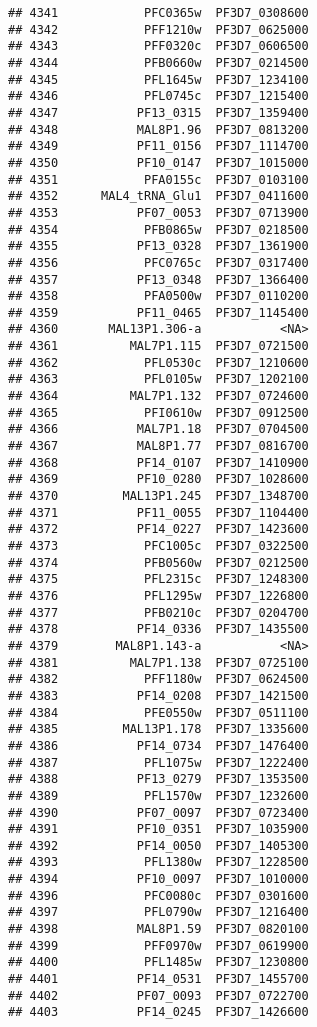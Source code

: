 \documentclass{article}\usepackage[]{graphicx}\usepackage[]{color}
\makeatletter
\newenvironment{kframe}{%
 \def\at@end@of@kframe{}%
 \ifinner\ifhmode%
  \def\at@end@of@kframe{\end{minipage}}%
  \begin{minipage}{\columnwidth}%
 \fi\fi%
 \def\FrameCommand##1{\hskip\@totalleftmargin \hskip-\fboxsep
 \colorbox{shadecolor}{##1}\hskip-\fboxsep
     \hskip-\linewidth \hskip-\@totalleftmargin \hskip\columnwidth}%
 \MakeFramed {\advance\hsize-\width
   \@totalleftmargin\z@ \linewidth\hsize
   \@setminipage}}%
 {\par\unskip\endMakeFramed%
 \at@end@of@kframe}
\newenvironment{knitrout}{}{} %
\makeatother
\begin{document}
\begin{knitrout}
\begin{kframe}
\begin{verbatim}
## 4341            PFC0365w  PF3D7_0308600
## 4342            PFF1210w  PF3D7_0625000
## 4343            PFF0320c  PF3D7_0606500
## 4344            PFB0660w  PF3D7_0214500
## 4345            PFL1645w  PF3D7_1234100
## 4346            PFL0745c  PF3D7_1215400
## 4347           PF13_0315  PF3D7_1359400
## 4348           MAL8P1.96  PF3D7_0813200
## 4349           PF11_0156  PF3D7_1114700
## 4350           PF10_0147  PF3D7_1015000
## 4351            PFA0155c  PF3D7_0103100
## 4352      MAL4_tRNA_Glu1  PF3D7_0411600
## 4353           PF07_0053  PF3D7_0713900
## 4354            PFB0865w  PF3D7_0218500
## 4355           PF13_0328  PF3D7_1361900
## 4356            PFC0765c  PF3D7_0317400
## 4357           PF13_0348  PF3D7_1366400
## 4358            PFA0500w  PF3D7_0110200
## 4359           PF11_0465  PF3D7_1145400
## 4360       MAL13P1.306-a           <NA>
## 4361          MAL7P1.115  PF3D7_0721500
## 4362            PFL0530c  PF3D7_1210600
## 4363            PFL0105w  PF3D7_1202100
## 4364          MAL7P1.132  PF3D7_0724600
## 4365            PFI0610w  PF3D7_0912500
## 4366           MAL7P1.18  PF3D7_0704500
## 4367           MAL8P1.77  PF3D7_0816700
## 4368           PF14_0107  PF3D7_1410900
## 4369           PF10_0280  PF3D7_1028600
## 4370         MAL13P1.245  PF3D7_1348700
## 4371           PF11_0055  PF3D7_1104400
## 4372           PF14_0227  PF3D7_1423600
## 4373            PFC1005c  PF3D7_0322500
## 4374            PFB0560w  PF3D7_0212500
## 4375            PFL2315c  PF3D7_1248300
## 4376            PFL1295w  PF3D7_1226800
## 4377            PFB0210c  PF3D7_0204700
## 4378           PF14_0336  PF3D7_1435500
## 4379        MAL8P1.143-a           <NA>
## 4381          MAL7P1.138  PF3D7_0725100
## 4382            PFF1180w  PF3D7_0624500
## 4383           PF14_0208  PF3D7_1421500
## 4384            PFE0550w  PF3D7_0511100
## 4385         MAL13P1.178  PF3D7_1335600
## 4386           PF14_0734  PF3D7_1476400
## 4387            PFL1075w  PF3D7_1222400
## 4388           PF13_0279  PF3D7_1353500
## 4389            PFL1570w  PF3D7_1232600
## 4390           PF07_0097  PF3D7_0723400
## 4391           PF10_0351  PF3D7_1035900
## 4392           PF14_0050  PF3D7_1405300
## 4393            PFL1380w  PF3D7_1228500
## 4394           PF10_0097  PF3D7_1010000
## 4396            PFC0080c  PF3D7_0301600
## 4397            PFL0790w  PF3D7_1216400
## 4398           MAL8P1.59  PF3D7_0820100
## 4399            PFF0970w  PF3D7_0619900
## 4400            PFL1485w  PF3D7_1230800
## 4401           PF14_0531  PF3D7_1455700
## 4402           PF07_0093  PF3D7_0722700
## 4403           PF14_0245  PF3D7_1426600

\end{verbatim}
\end{kframe}
\end{knitrout}
\end{document}
